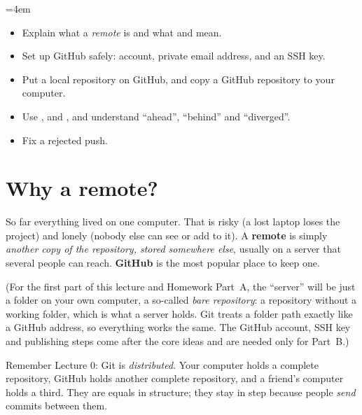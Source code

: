 
\emergencystretch=4em


\begin{goals}
\begin{itemize}
  \item Explain what a \emph{remote} is and what  and  mean.
  \item Set up GitHub safely: account, private email address, and an SSH key.
  \item Put a local repository on GitHub, and copy a GitHub repository to your computer.
  \item Use ,  and , and understand ``ahead'', ``behind'' and ``diverged''.
  \item Fix a rejected push.
\end{itemize}
\end{goals}

\section{Why a remote?}

So far everything lived on one computer. That is risky (a lost laptop loses the project) and lonely (nobody else can see or add to it). A \textbf{remote} is simply \emph{another copy of the repository, stored somewhere else}, usually on a server that several people can reach. \textbf{GitHub} is the most popular place to keep one.

(For the first part of this lecture and Homework Part~A, the ``server'' will be just a folder on your own computer, a so-called \emph{bare repository}: a repository without a working folder, which is what a server holds. Git treats a folder path exactly like a GitHub address, so everything works the same. The GitHub account, SSH key and publishing steps come after the core ideas and are needed only for Part~B.)

Remember Lecture 0: Git is \emph{distributed}. Your computer holds a complete repository, GitHub holds another complete repository, and a friend's computer holds a third. They are equals in structure; they stay in step because people \emph{send} commits between them.

